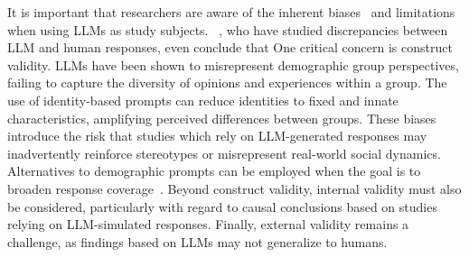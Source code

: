It is important that researchers are aware of the inherent biases~\cite{Crowell2023} and limitations~\cite{DBLP:journals/ais/HardingDLL24, DBLP:journals/corr/abs-2402-01908} when using LLMs as study subjects. 
\citeauthor{schroeder2025llmspsychology}~\cite{schroeder2025llmspsychology}, who have studied discrepancies between LLM and human responses, even conclude that 
One critical concern is construct validity.
LLMs have been shown to misrepresent demographic group perspectives, failing to capture the diversity of opinions and experiences within a group.
The use of identity-based prompts can reduce identities to fixed and innate characteristics, amplifying perceived differences between groups.
These biases introduce the risk that studies which rely on LLM-generated responses may inadvertently reinforce stereotypes or misrepresent real-world social dynamics.
Alternatives to demographic prompts can be employed when the goal is to broaden response coverage~\cite{DBLP:journals/corr/abs-2402-01908}.
Beyond construct validity, internal validity must also be considered, particularly with regard to causal conclusions based on studies relying on LLM-simulated responses.
Finally, external validity remains a challenge, as findings based on LLMs may not generalize to humans.
